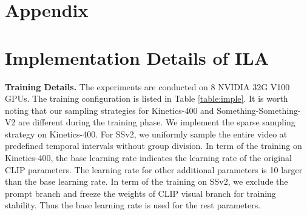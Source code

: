 \documentclass[10pt,twocolumn,letterpaper]{article}
\begin{document}
\appendix

\section*{Appendix}

\section{Implementation Details of ILA}

\noindent\textbf{Training Details.} The experiments are conducted on 8 NVIDIA 32G V100 GPUs. The training configuration is listed in Table \ref{table:imple}. It is worth noting that our sampling strategies for Kinetics-400 and Something-Something-V2 are different during the training phase. We implement the sparse sampling strategy on Kinetics-400. For SSv2, we uniformly sample the entire video at predefined temporal intervals without group division. 
In term of the training on Kinetics-400, the base learning rate indicates the learning rate of the original CLIP parameters. The learning rate for other additional parameters is 10 larger than the base learning rate. 
In term of the training on SSv2, we exclude the prompt branch and freeze the weights of CLIP visual branch for training stability.
Thus the base learning rate is used for the rest parameters.
\end{document}
